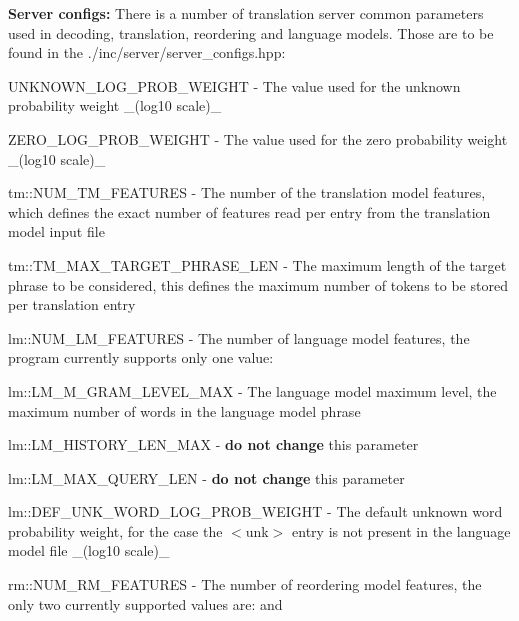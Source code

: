 {\bfseries Server configs\+:} There is a number of translation server common parameters used in decoding, translation, reordering and language models. Those are to be found in the {\ttfamily ./inc/server/server\+\_\+configs.hpp}\+:


\begin{DoxyItemize}
\item {\ttfamily U\+N\+K\+N\+O\+W\+N\+\_\+\+L\+O\+G\+\_\+\+P\+R\+O\+B\+\_\+\+W\+E\+I\+G\+H\+T} -\/ The value used for the unknown probability weight \+\_\+(log10 scale)\+\_\+
\item {\ttfamily Z\+E\+R\+O\+\_\+\+L\+O\+G\+\_\+\+P\+R\+O\+B\+\_\+\+W\+E\+I\+G\+H\+T} -\/ The value used for the \textquotesingle{}zero\textquotesingle{} probability weight \+\_\+(log10 scale)\+\_\+
\item {\ttfamily tm\+::\+N\+U\+M\+\_\+\+T\+M\+\_\+\+F\+E\+A\+T\+U\+R\+E\+S} -\/ The number of the translation model features, which defines the exact number of features read per entry from the translation model input file
\item {\ttfamily tm\+::\+T\+M\+\_\+\+M\+A\+X\+\_\+\+T\+A\+R\+G\+E\+T\+\_\+\+P\+H\+R\+A\+S\+E\+\_\+\+L\+E\+N} -\/ The maximum length of the target phrase to be considered, this defines the maximum number of tokens to be stored per translation entry
\item {\ttfamily lm\+::\+N\+U\+M\+\_\+\+L\+M\+\_\+\+F\+E\+A\+T\+U\+R\+E\+S} -\/ The number of language model features, the program currently supports only one value\+: {}
\item {\ttfamily lm\+::\+L\+M\+\_\+\+M\+\_\+\+G\+R\+A\+M\+\_\+\+L\+E\+V\+E\+L\+\_\+\+M\+A\+X} -\/ The language model maximum level, the maximum number of words in the language model phrase
\item {\ttfamily lm\+::\+L\+M\+\_\+\+H\+I\+S\+T\+O\+R\+Y\+\_\+\+L\+E\+N\+\_\+\+M\+A\+X} -\/ {\bfseries do not change} this parameter
\item {\ttfamily lm\+::\+L\+M\+\_\+\+M\+A\+X\+\_\+\+Q\+U\+E\+R\+Y\+\_\+\+L\+E\+N} -\/ {\bfseries do not change} this parameter
\item {\ttfamily lm\+::\+D\+E\+F\+\_\+\+U\+N\+K\+\_\+\+W\+O\+R\+D\+\_\+\+L\+O\+G\+\_\+\+P\+R\+O\+B\+\_\+\+W\+E\+I\+G\+H\+T} -\/ The default unknown word probability weight, for the case the {\ttfamily $<$unk$>$} entry is not present in the language model file \+\_\+(log10 scale)\+\_\+
\item {\ttfamily rm\+::\+N\+U\+M\+\_\+\+R\+M\+\_\+\+F\+E\+A\+T\+U\+R\+E\+S} -\/ The number of reordering model features, the only two currently supported values are\+: {} and {}
\end{DoxyItemize}

